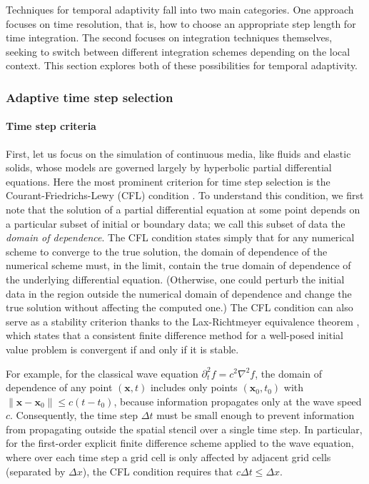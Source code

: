 Techniques for temporal adaptivity fall into two main categories.
One approach focuses on time resolution, that is, how to choose an appropriate step length for time integration.
The second focuses on integration techniques themselves, seeking to switch between different integration schemes depending on the local context.
This section explores both of these possibilities for temporal adaptivity.


\subsubsection{Adaptive time step selection}


\paragraph*{Time step criteria}


First, let us focus on the simulation of continuous media, like fluids and elastic solids, whose models are governed largely by hyperbolic partial differential equations.
Here the most prominent criterion for time step selection is the Courant-Friedrichs-Lewy (CFL) condition \cite{Courant1928}.
To understand this condition, we first note that the solution of a partial differential equation at some point depends on a particular subset of initial or boundary data; we call this subset of data the \emph{domain of dependence}.
The CFL condition states simply that for any numerical scheme to converge to the true solution, the domain of dependence of the numerical scheme must, in the limit, contain the true domain of dependence of the underlying differential equation.
(Otherwise, one could perturb the initial data in the region outside the numerical domain of dependence and change the true solution without affecting the computed one.)
The CFL condition can also serve as a stability criterion thanks to the Lax-Richtmeyer equivalence theorem \cite{Lax1956,Strikwerda2004}, which states that a consistent finite difference method for a well-posed initial value problem is convergent if and only if it is stable.


For example, for the classical wave equation $\partial_t^2 f = c^2\nabla^2 f$, the domain of dependence of any point $(\mathbf x, t)$ includes only points $(\mathbf x_0, t_0)$ with $\|\mathbf x-\mathbf x_0\|\le c(t-t_0)$, because information propagates only at the wave speed $c$.
Consequently, the time step $\Delta t$ must be small enough to prevent information from propagating outside the spatial stencil over a single time step.
In particular, for the first-order explicit finite difference scheme applied to the wave equation, where over each time step a grid cell is only affected by adjacent grid cells (separated by $\Delta x$), the CFL condition requires that $c\Delta t \le \Delta x$.

